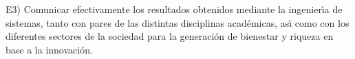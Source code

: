 E3) Comunicar efectivamente los resultados obtenidos mediante la
ingenier\'{\i}a de sistemas, tanto con pares de las distintas disciplinas
acad\'{e}micas, as\'{\i} como con los diferentes sectores de la sociedad para
la generaci\'{o}n de bienestar y riqueza en base a la innovaci\'{o}n.

